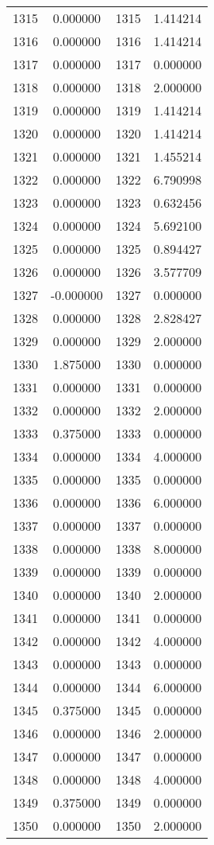 \documentclass[12pt]{article}
\begin{document}
\begin{longtable}{@{}cccc@{}}
1315 & 0.000000 & 1315 & 1.414214 \\
1316 & 0.000000 & 1316 & 1.414214 \\
1317 & 0.000000 & 1317 & 0.000000 \\
1318 & 0.000000 & 1318 & 2.000000 \\
1319 & 0.000000 & 1319 & 1.414214 \\
1320 & 0.000000 & 1320 & 1.414214 \\
1321 & 0.000000 & 1321 & 1.455214 \\
1322 & 0.000000 & 1322 & 6.790998 \\
1323 & 0.000000 & 1323 & 0.632456 \\
1324 & 0.000000 & 1324 & 5.692100 \\
1325 & 0.000000 & 1325 & 0.894427 \\
1326 & 0.000000 & 1326 & 3.577709 \\
1327 & -0.000000 & 1327 & 0.000000 \\
1328 & 0.000000 & 1328 & 2.828427 \\
1329 & 0.000000 & 1329 & 2.000000 \\
1330 & 1.875000 & 1330 & 0.000000 \\
1331 & 0.000000 & 1331 & 0.000000 \\
1332 & 0.000000 & 1332 & 2.000000 \\
1333 & 0.375000 & 1333 & 0.000000 \\
1334 & 0.000000 & 1334 & 4.000000 \\
1335 & 0.000000 & 1335 & 0.000000 \\
1336 & 0.000000 & 1336 & 6.000000 \\
1337 & 0.000000 & 1337 & 0.000000 \\
1338 & 0.000000 & 1338 & 8.000000 \\
1339 & 0.000000 & 1339 & 0.000000 \\
1340 & 0.000000 & 1340 & 2.000000 \\
1341 & 0.000000 & 1341 & 0.000000 \\
1342 & 0.000000 & 1342 & 4.000000 \\
1343 & 0.000000 & 1343 & 0.000000 \\
1344 & 0.000000 & 1344 & 6.000000 \\
1345 & 0.375000 & 1345 & 0.000000 \\
1346 & 0.000000 & 1346 & 2.000000 \\
1347 & 0.000000 & 1347 & 0.000000 \\
1348 & 0.000000 & 1348 & 4.000000 \\
1349 & 0.375000 & 1349 & 0.000000 \\
1350 & 0.000000 & 1350 & 2.000000 \\

\end{longtable}
\end{document}
